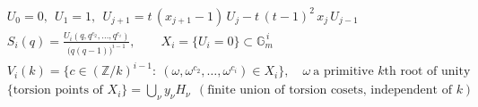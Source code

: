 \documentclass{article}
\begin{document}
\[
\begin{aligned}
&U_0=0,\ \ U_1=1,\ \ U_{j+1}=t\,(x_{j+1}-1)\,U_j-t\,(t-1)^{2}\,x_j\,U_{j-1}\\
&S_i(q)=\frac{U_i(q,q^{c_2},\dots,q^{c_i})}{\bigl(q(q-1)\bigr)^{i-1}},\qquad X_i=\{U_i=0\}\subset\mathbb{G}_m^{\,i}\\
&V_i(k)=\{c\in(\mathbb{Z}/k)^{i-1}:\ (\omega,\omega^{c_2},\dots,\omega^{c_i})\in X_i\},\quad \omega\ \text{a primitive }k\text{th root of unity}\\
&\{\text{torsion points of }X_i\}=\textstyle\bigcup_{\nu}y_\nu H_\nu\ \ (\text{finite union of torsion cosets, independent of }k)
\end{aligned}
\]
\end{document}
